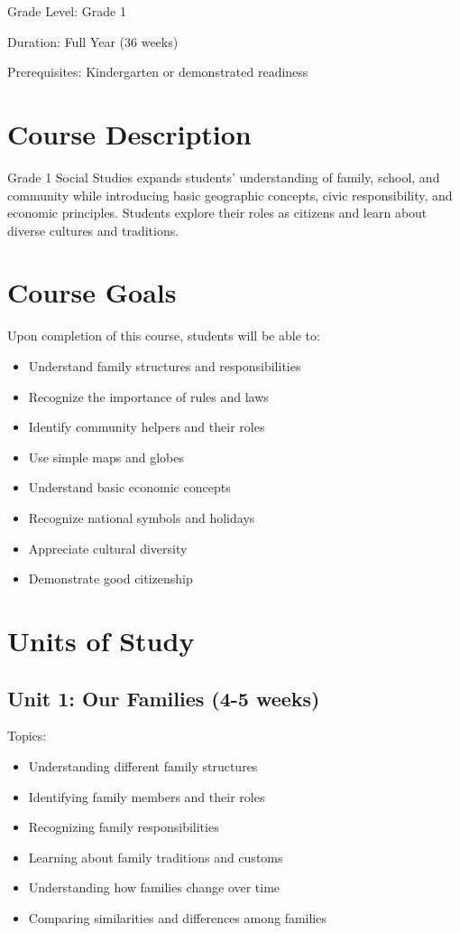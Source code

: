 \documentclass[11pt,letterpaper]{report}
\begin{document}
Grade Level: Grade 1

Duration: Full Year (36 weeks)

Prerequisites: Kindergarten or demonstrated readiness

\section{Course Description}

Grade 1 Social Studies expands students' understanding of family, school, and community while introducing basic geographic concepts, civic responsibility, and economic principles. Students explore their roles as citizens and learn about diverse cultures and traditions.

\section{Course Goals}

Upon completion of this course, students will be able to:

\begin{itemize}
\item Understand family structures and responsibilities
\item Recognize the importance of rules and laws
\item Identify community helpers and their roles
\item Use simple maps and globes
\item Understand basic economic concepts
\item Recognize national symbols and holidays
\item Appreciate cultural diversity
\item Demonstrate good citizenship
\end{itemize}

\section{Units of Study}

\subsection{Unit 1: Our Families (4-5 weeks)}

Topics:
\begin{itemize}
\item Understanding different family structures
\item Identifying family members and their roles
\item Recognizing family responsibilities
\item Learning about family traditions and customs
\item Understanding how families change over time
\item Comparing similarities and differences among families
\end{itemize}
\end{document}
